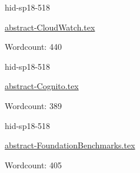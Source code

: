

\begin{IU}

hid-sp18-518

\href{https://github.com/cloudmesh-community/hid-sp18-518/blob/master//technology/abstract-CloudWatch.tex}{abstract-CloudWatch.tex}

 

Wordcount: 440

\end{IU}



\begin{IU}

hid-sp18-518

\href{https://github.com/cloudmesh-community/hid-sp18-518/blob/master//technology/abstract-Cognito.tex}{abstract-Cognito.tex}

 

Wordcount: 389

\end{IU}



\begin{IU}

hid-sp18-518

\href{https://github.com/cloudmesh-community/hid-sp18-518/blob/master//technology/abstract-FoundationBenchmarks.tex}{abstract-FoundationBenchmarks.tex}

 

Wordcount: 405

\end{IU}



